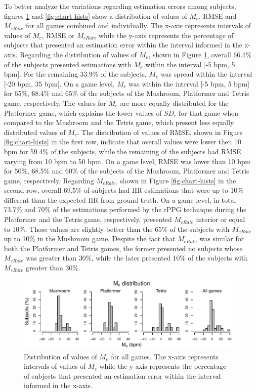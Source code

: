 To better analyze the variations regarding estimation errors among subjects, figures \ref{fig:chart-hists-me} and \ref{fig:chart-hists} show a distribution of values of $M_e$, RMSE and $M_{eRate}$ for all games combined and individually. The x-axis represents intervals of values of $M_e$, RMSE or $M_{eRate}$ while the y-axis represents the percentage of subjects that presented an estimation error within the interval informed in the x-axis. Regarding the distribution of values of $M_e$, shown in Figure \ref{fig:chart-hists-me}, overall 66.1\% of the subjects presented estimations with $M_e$ within the interval [-5 bpm, 5 bpm]. For the remaining 33.9\% of the subjects, $M_e$ was spread within the interval [-20 bpm, 35 bpm]. On a game level, $M_e$ was within the interval [-5 bpm, 5 bpm] for 65\%, 68.4\% and 65\% of the subjects of the Mushroom, Platformer and Tetris game, respectively. The values for $M_e$ are more equally distributed for the Platformer game, which explains the lower values of $SD_e$ for that game when compared to the Mushroom and the Tetris game, which present less equally distributed values of $M_e$.
The distribution of values of RMSE, shown in Figure \ref{fig:chart-hists} in the first row, indicate that overall values were lower then 10 bpm for 59.4\% of the subjects, while the remaining of the subjects had RMSE varying from 10 bpm to 50 bpm. On a game level, RMSE was lower than 10 bpm for 50\%, 68.5\% and 60\% of the subjects of the Mushroom, Platformer and Tetris game, respectively. Regarding $M_{eRate}$, shown in Figure \ref{fig:chart-hists} in the second row, overall 69.5\% of subjects had HR estimations that were up to 10\% different than the expected HR from ground truth. On a game level, in total 73.7\% and 70\% of the estimations performed by the rPPG technique during the Platformer and the Tetris game, respectively, presented $M_{eRate}$ interior or equal to 10\%. Those values are slightly better than the 65\% of the subjects with $M_{eRate}$ up to 10\% in the Mushroom game. Despite the fact that $M_{eRate}$ was similar for both the Platformer and Tetris games, the former presented no subjects whose $M_{eRate}$ was greater than 30\%, while the later presented 10\% of the subjects with $M_{eRate}$ greater than 30\%.

\begin{figure}
\centering
\includegraphics[width=\textwidth]{figures/hist-me.pdf}
\caption{Distribution of values of $M_e$ for all games. The x-axis represents intervals of values of $M_e$ while the y-axis represents the percentage of subjects that presented an estimation error within the interval informed in the x-axis.}
\label{fig:chart-hists-me}
\end{figure}

